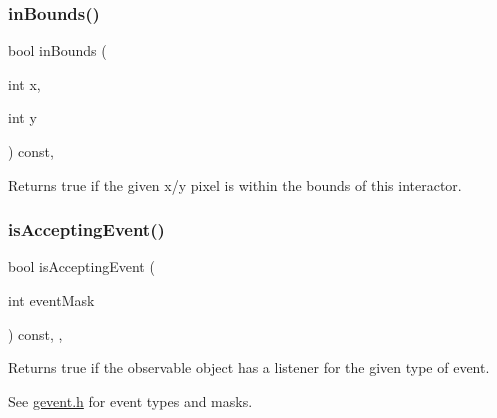 \subsubsection{\texorpdfstring{in\+Bounds()}{inBounds()}\hspace{0.1cm}{\footnotesize\ttfamily [2/2]}}
{\footnotesize\ttfamily bool in\+Bounds (\begin{DoxyParamCaption}\item[{int}]{x,  }\item[{int}]{y }\end{DoxyParamCaption}) const\hspace{0.3cm}{\ttfamily [virtual]}, {\ttfamily [inherited]}}



Returns true if the given x/y pixel is within the bounds of this interactor. 

\mbox{\label{classsgl_1_1GObservable_aeec1adc19aa0f33de62390686ee1382c}} 
\subsubsection{\texorpdfstring{is\+Accepting\+Event()}{isAcceptingEvent()}\hspace{0.1cm}{\footnotesize\ttfamily [1/3]}}
{\footnotesize\ttfamily bool is\+Accepting\+Event (\begin{DoxyParamCaption}\item[{int}]{event\+Mask }\end{DoxyParamCaption}) const\hspace{0.3cm}{\ttfamily [protected]}, {\ttfamily [virtual]}, {\ttfamily [inherited]}}



Returns true if the observable object has a listener for the given type of event. 

See \mbox{\hyperlink{gevent_8h_source}{gevent.\+h}} for event types and masks. \mbox{\label{classsgl_1_1GObservable_aa31c73145a29dcb92848a92e0cfaea41}} 
